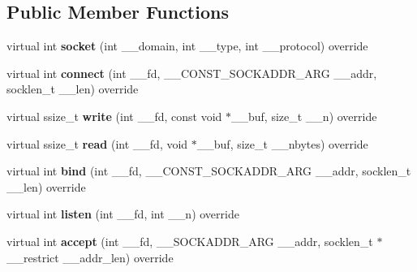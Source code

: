 \subsection*{Public Member Functions}
\begin{DoxyCompactItemize}
\item 
\mbox{\label{classBsdSocketFactoryDefault_ae56c8979788fa1092ee7f8b3ed52d2ba}} 
virtual int {\bfseries socket} (int \+\_\+\+\_\+domain, int \+\_\+\+\_\+type, int \+\_\+\+\_\+protocol) override
\item 
\mbox{\label{classBsdSocketFactoryDefault_a1e2faa4b38f70b662d5fcff501cd1dd1}} 
virtual int {\bfseries connect} (int \+\_\+\+\_\+fd, \+\_\+\+\_\+\+C\+O\+N\+S\+T\+\_\+\+S\+O\+C\+K\+A\+D\+D\+R\+\_\+\+A\+RG \+\_\+\+\_\+addr, socklen\+\_\+t \+\_\+\+\_\+len) override
\item 
\mbox{\label{classBsdSocketFactoryDefault_a83eaa1d6e746a676ffa049b284fa7d0a}} 
virtual ssize\+\_\+t {\bfseries write} (int \+\_\+\+\_\+fd, const void $\ast$\+\_\+\+\_\+buf, size\+\_\+t \+\_\+\+\_\+n) override
\item 
\mbox{\label{classBsdSocketFactoryDefault_a17cb735df563f8e9d8329f2293f96209}} 
virtual ssize\+\_\+t {\bfseries read} (int \+\_\+\+\_\+fd, void $\ast$\+\_\+\+\_\+buf, size\+\_\+t \+\_\+\+\_\+nbytes) override
\item 
\mbox{\label{classBsdSocketFactoryDefault_ab601ea872ecf968e63b1ced7bde5e0da}} 
virtual int {\bfseries bind} (int \+\_\+\+\_\+fd, \+\_\+\+\_\+\+C\+O\+N\+S\+T\+\_\+\+S\+O\+C\+K\+A\+D\+D\+R\+\_\+\+A\+RG \+\_\+\+\_\+addr, socklen\+\_\+t \+\_\+\+\_\+len) override
\item 
\mbox{\label{classBsdSocketFactoryDefault_a60acd85e3aa1439b3e91ee673d358ad7}} 
virtual int {\bfseries listen} (int \+\_\+\+\_\+fd, int \+\_\+\+\_\+n) override
\item 
\mbox{\label{classBsdSocketFactoryDefault_a4cd3062f5fe9a8fcc0191e51ab2e021a}} 
virtual int {\bfseries accept} (int \+\_\+\+\_\+fd, \+\_\+\+\_\+\+S\+O\+C\+K\+A\+D\+D\+R\+\_\+\+A\+RG \+\_\+\+\_\+addr, socklen\+\_\+t $\ast$\+\_\+\+\_\+restrict \+\_\+\+\_\+addr\+\_\+len) override

\end{DoxyCompactItemize}

